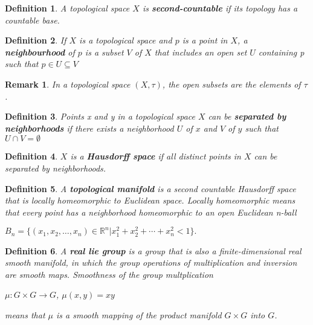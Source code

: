 \documentclass[12pt]{article}
\newcommand{\real}{\mathbb{R}}
\newcommand\set[1]{\{#1\}}
\newtheorem{defn}{Definition}[thm]
\newtheorem*{remark}{Remark}
\begin{document}
\begin{defn}
  A topological space $X$ is \textbf{second-countable} if its topology has a countable base.
\end{defn}

\begin{defn}
  If $X$ is a topological space and $p$ is a point in $X$, a \textbf{neighbourhood}
  of $p$ is a subset $V$ of $X$ that includes an open set $U$ containing p such that $ p \in U \subseteq V$
\end{defn}
\begin{remark}
  In a topological space $(X, \tau)$, the open subsets are the elements of $\tau$.
\end{remark}
\begin{defn}
  Points x and y in a topological space $X$ can be \textbf{separated by neighborhoods}
  if there exists a neighborhood $U$ of $x$ and $V$ of $y$ such that $U \cap V = \emptyset$
\end{defn}

\begin{defn}
  $X$ is a \textbf{Hausdorff space} if all distinct points in $X$ can be separated by neighborhoods.
\end{defn}

\begin{defn}
  A \textbf{topological manifold} is a second countable Hausdorff space that is locally homeomorphic to Euclidean space. Locally homeomorphic means that every point has a neighborhood homeomorphic to an open Euclidean n-ball
  \begin{center}
    $B_n = \set{(x_1,x_2,\dots,x_n) \in \real^n | x_1^2 + x_2^2 + \cdots + x_n^2 < 1}.$
  \end{center}
\end{defn}


\begin{defn}
  A \textbf{real lie group} is a group that is also a finite-dimensional real smooth manifold, in which the group operations of multiplication and inversion are smooth maps. Smoothness of the group multplication
\begin{center}
  $\mu : G \times G \to G$,  $\mu(x,y)=xy$
\end{center}
  means that $\mu$ is a smooth mapping of the product manifold $G \times G$ into $G$.
\end{defn}
\end{document}
